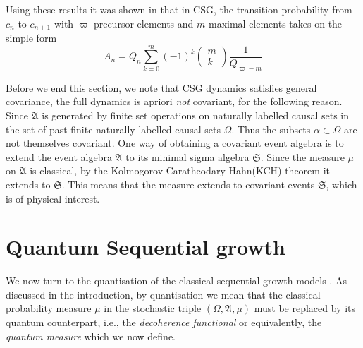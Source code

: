 \documentclass[11pt]{article}
\newcommand{\fA}{\mathfrak A}
\newcommand{\fS}{\mathfrak S}
\begin{document}
Using these results it was shown in \cite{csgone} that in CSG, the
transition probability from $c_n$ to $c_{n+1}$ with $\varpi$ precursor
elements and $m$ maximal elements takes on the simple form 
\begin{equation}
A_n=Q_n\sum_{k=0}^{m} (-1)^k \begin{pmatrix}
m\\k 
\end{pmatrix}\frac{1}{Q_{\varpi-m}}
\end{equation}


Before we end this section, we note that CSG dynamics
satisfies general covariance, the full dynamics is apriori {\it not} 
covariant, for the following reason. Since $\fA$ is generated by
finite set operations on naturally labelled causal sets in the set of
past finite naturally labelled causal sets $\Omega$. Thus the
subsets $\alpha \subset \Omega$ are not themselves covariant.  One way
of obtaining  a covariant event algebra \cite{observables} is to
extend the event algebra $\fA$ to its minimal sigma algebra
$\fS$. Since the measure $\mu$ on $\fA$ is classical, by the
Kolmogorov-Caratheodary-Hahn(KCH)  theorem it
extends to $\fS$. This means that the measure extends to covariant events 
$\fS$, which is of physical interest.





\section{Quantum Sequential growth}
\label{qsg.sec} 

We now turn to the quantisation of the classical sequential growth
models \cite{djs,sz}. As discussed in the introduction, by
quantisation we mean that the classical probability measure  $\mu$ in
the  
stochastic  triple  $(\Omega, \fA, \mu)$ must be replaced by its
quantum counterpart, i.e., the {\sl decoherence functional} or
equivalently, the {\sl  quantum measure}
\cite{qmeasureone}\cite{qmeasuretwo} which we now define. 
\end{document}
